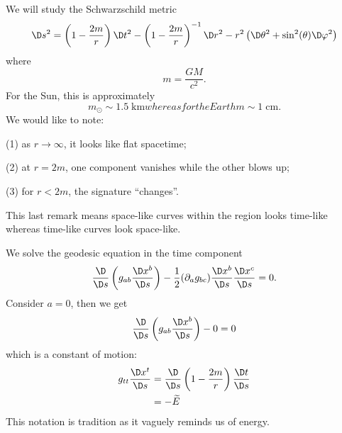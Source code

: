 
We will study the Schwarzschild metric
\begin{equation}
\D s^{2}=\left(1-\frac{2m}{r}\right)\D t^{2}
-\left(1-\frac{2m}{r}\right)^{-1}\D r^{2}
-r^{2}\left(\D\theta^{2}+\sin^{2}(\theta)\D\varphi^{2}\right)
\end{equation}
where
\begin{equation}
m=\frac{GM}{c^{2}}.
\end{equation}
For the Sun, this is approximately
\begin{subequations}
\begin{equation}
m_{\odot}\sim 1.5\;\mbox{km}
\end{equation}
whereas for the Earth
\begin{equation}
m\sim 1\;\mbox{cm}.
\end{equation}
\end{subequations}
We would like to note:

(1) as $r\to\infty$, it looks like flat spacetime;

(2) at $r=2m$, one component vanishes while the other blows up;

(3) for $r<2m$, the signature ``changes''.

\noindent\ignorespaces %
This last remark means space-like curves within the region looks
time-like whereas time-like curves look space-like.

We solve the geodesic equation in the time component
\begin{equation}
\frac{\D}{\D s}\left(g_{ab}\frac{\D x^{b}}{\D s}\right)
-\frac{1}{2}(\partial_{a}g_{bc})\frac{\D x^{b}}{\D s}
\frac{\D x^{c}}{\D s}=0.
\end{equation}
Consider $a=0$, then we get
\begin{equation}
\frac{\D}{\D s}\left(g_{ab}\frac{\D x^{b}}{\D s}\right)-0=0
\end{equation}
which is a constant of motion:
\begin{equation}
\begin{split}
g_{tt}\frac{\D x^{t}}{\D s} &=\frac{\D}{\D s}
\left(1-\frac{2m}{r}\right)\frac{\D t}{\D s}\\
&=-\widetilde{E}
\end{split}
\end{equation}
This notation is tradition as it vaguely reminds us of energy.

